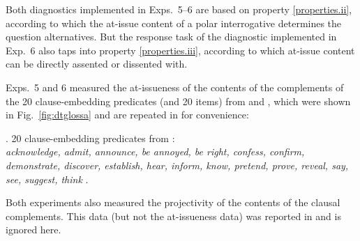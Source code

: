 \documentclass[times,linguex]{glossa}
\begin{document}
Both diagnostics implemented in Exps.~5--6 are based on property \ref{properties.ii}, according to which the at-issue content of a polar interrogative determines the question alternatives. But the response task of the diagnostic implemented in Exp.~6 also taps into property \ref{properties.iii}, according to which at-issue content can be directly assented or dissented with. 


Exps.~5 and 6 measured the at-issueness of the contents of the complements of the 20 clause-embedding predicates (and 20 items) from \citealt{degen_are_2022} and \citealt{degen_projection_2025}, which were shown in Fig.~\ref{fig:dtglossa} and are repeated in \Next for convenience:

\ex. \label{ex:predicates}
20 clause-embedding predicates from \citealt{degen_projection_2025}: \\
\emph{acknowledge,  admit, announce, be annoyed, be right, confess, confirm, demonstrate, discover, establish, hear, inform, know, pretend, prove, reveal, say, see, suggest, think}
\z. 

Both experiments also measured the projectivity of the contents of the clausal complements. This data (but not the at-issueness data) was reported in \citealt{hofmann-etal2024} and is ignored here.

\end{document}
